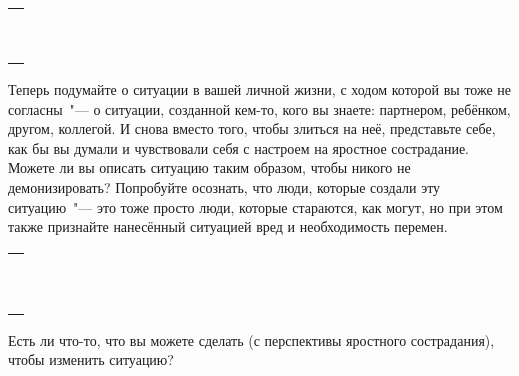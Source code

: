 \setlength{\extrarowheight}{2mm}
\begin{tabularx}{\textwidth}{X}
	\\
	\arrayrulecolor{gray}\hline\\
	\hline\\
	\hline\\
	\hline\\
	\hline\\
	\hline\\	
	\hline\\
	\hline\\
	\hline\\
	\hline\\
\end{tabularx}
\setlength{\extrarowheight}{0mm}
\begin{itemize}
	\itemWritingHand Теперь подумайте о ситуации в вашей личной жизни, с ходом которой вы тоже не согласны~"--- о ситуации, созданной кем-то, кого вы знаете: партнером, ребёнком, другом, коллегой. И снова вместо того, чтобы злиться на неё, представьте себе, как бы вы думали и чувствовали себя с настроем на яростное сострадание. Можете ли вы описать ситуацию таким образом, чтобы никого не демонизировать? Попробуйте осознать, что люди, которые создали эту ситуацию~"--- это тоже просто люди, которые стараются, как могут, но при этом также признайте нанесённый ситуацией вред и необходимость перемен.
\end{itemize}

\setlength{\extrarowheight}{2mm}
\begin{tabularx}{\textwidth}{X}
	\\
	\arrayrulecolor{gray}\hline\\
	\hline\\
	\hline\\
	\hline\\
	\hline\\
	\hline\\	
	\hline\\
	\hline\\
	\hline\\
	\hline\\
	\hline\\
\end{tabularx}
\setlength{\extrarowheight}{0mm}
\begin{itemize}
	\itemWritingHand Есть ли что-то, что вы можете сделать (с перспективы яростного сострадания), чтобы изменить ситуацию?
\end{itemize}


